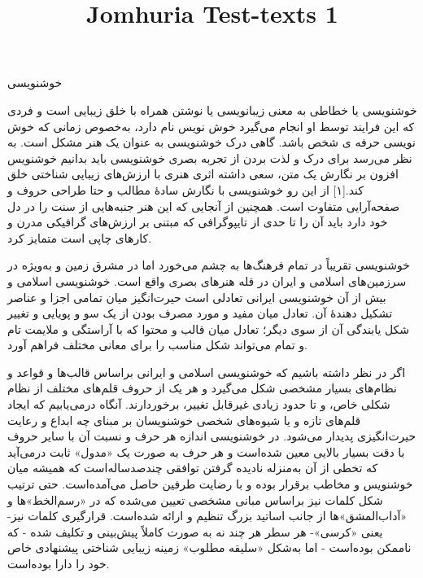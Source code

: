 \documentclass[a4paper]{article}
\title{Jomhuria Test-texts 1}
\begin{document}
\pagecolor{pagecolor}
\color{textcolor}

\begin{english}\maketitle\end{english}
\newpage

\begin{flushright}


خوشنویسی

خوشنویسی یا خطاطی به معنی زیبانویسی یا نوشتن همراه با خلق زیبایی است و فردی که این فرایند توسط او انجام می‌گیرد خوش نویس نام دارد، به‌خصوص زمانی که خوش نویسی حرفه ی شخص باشد. گاهی درک خوشنویسی به عنوان یک هنر مشکل است. به نظر می‌رسد برای درک و لذت بردن از تجربه بصری خوشنویسی باید بدانیم خوشنویس افزون بر نگارش یک متن، سعی داشته اثری هنری با ارزش‌های زیبایی شناختی خلق کند.[۱] از این رو خوشنویسی با نگارش سادهٔ مطالب و حتا طراحی حروف و صفحه‌آرایی متفاوت است. همچنین از آنجایی که این هنر جنبه‌هایی از سنت را در دل خود دارد باید آن را تا حدی از تایپوگرافی که مبتنی بر ارزش‌های گرافیکی مدرن و کارهای چاپی است متمایز کرد.

خوشنویسی تقریباً در تمام فرهنگ‌ها به چشم می‌خورد اما در مشرق زمین و به‌ویژه در سرزمین‌های اسلامی و ایران در قله هنرهای بصری واقع است. خوشنویسی اسلامی و بیش از آن خوشنویسی ایرانی تعادلی است حیرت‌انگیز میان تمامی اجزا و عناصر تشکیل دهندهٔ آن. تعادل میان مفید و مورد مصرف بودن از یک سو و پویایی و تغییر شکل یابندگی آن از سوی دیگر؛ تعادل میان قالب و محتوا که با آراستگی و ملایمت تام و تمام می‌تواند شکل مناسب را برای معانی مختلف فراهم آورد.

اگر در نظر داشته باشیم که خوشنویسی اسلامی و ایرانی براساس قالب‌ها و قواعد و نظام‌های بسیار مشخصی شکل می‌گیرد و هر یک از حروف قلم‌های مختلف از نظام شکلی خاص، و تا حدود زیادی غیرقابل تغییر، برخوردارند. آنگاه درمی‌یابیم که ایجاد قلم‌های تازه و یا شیوه‌های شخصی خوشنویسان بر مبنای چه ابداع و رعایت حیرت‌انگیزی پدیدار می‌شود. در خوشنویسی اندازه هر حرف و نسبت آن با سایر حروف با دقت بسیار بالایی معین شده‌است و هر حرف به صورت یک «مدول» ثابت درمی‌آید که تخطی از آن به‌منزله نادیده گرفتن توافقی چندصدساله‌است که همیشه میان خوشنویس و مخاطب برقرار بوده و با رضایت طرفین حاصل می‌آمده‌است. حتی ترتیب شکل کلمات نیز براساس مبانی مشخصی تعیین می‌شده که در «رسم‌الخط»ها و «آداب‌المشق»ها از جانب اساتید بزرگ تنظیم و ارائه شده‌است. قرارگیری کلمات نیز- یعنی «کرسی»- هر سطر هر چند نه به صورت کاملاً پیش‌بینی و تکلیف شده - که ناممکن بوده‌است - اما به‌شکل «سلیقه مطلوب» زمینه زیبایی شناختی پیشنهادی خاص خود را دارا بوده‌است.




\end{flushright}
\end{document}
